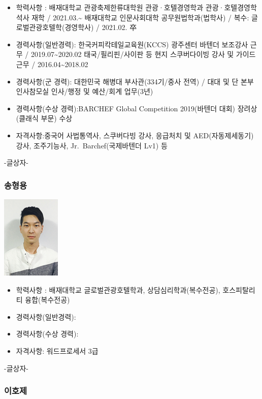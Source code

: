 \documentclass[
]{article}
\providecommand{\tightlist}{%
  \setlength{\itemsep}{0pt}\setlength{\parskip}{0pt}}
\begin{document}
\begin{itemize}
\tightlist
\item
  학력사항 : 배재대학교 관광축제한류대학원 관광·호텔경영학과
  관광·호텔경영학 석사 재학 / 2021.03.\textasciitilde{} 배재대학교
  인문사회대학 공무원법학과(법학사) / 복수: 글로벌관광호텔학(경영학사) /
  2021.02. 卒
\item
  경력사항(일반경력): 한국커피칵테일교육원(KCCS) 광주센터 바텐더
  보조강사 근무 / 2019.07\textasciitilde2020.02 태국/필리핀/사이판 등
  현지 스쿠버다이빙 강사 및 가이드 근무 / 2016.04\textasciitilde2018.02
\item
  경력사항(군 경력): 대한민국 해병대 부사관(334기/중사 전역) / 대대 및
  단 본부 인사참모실 인사/행정 및 예산/회계 업무(3년)
\item
  경력사항(수상 경력):BARCHEF Global Competition 2019(바텐더 대회)
  장려상(클래식 부문) 수상
\item
  자격사항:중국어 사법통역사, 스쿠버다빙 강사, 응급처치 및
  AED(자동제세동기) 강사, 조주기능사, Jr.~Barchef(국제바텐더 Lv1) 등
\end{itemize}

-글상자-

\hypertarget{uxc1a1uxd615uxc6a9}{%
\subsubsection{송형용}\label{uxc1a1uxd615uxc6a9}}

\includegraphics{images/figure3.png}

\begin{itemize}
\tightlist
\item
  학력사항 : 배재대학교 글로벌관광호텔학과, 상담심리학과(복수전공),
  호스피탈리티 융합(복수전공)
\item
  경력사항(일반경력):
\item
  경력사항(수상 경력):
\item
  자격사항: 워드프로세서 3급
\end{itemize}

-글상자-

\hypertarget{uxc774uxd638uxc81c}{%
\subsubsection{이호제}\label{uxc774uxd638uxc81c}}
\end{document}
